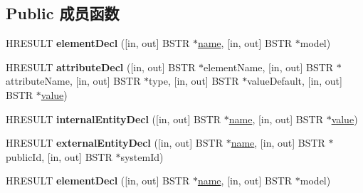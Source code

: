 \subsection*{Public 成员函数}
\begin{DoxyCompactItemize}
\item 
\mbox{\label{interface_m_s_x_m_l2_1_1_i_v_b_s_a_x_decl_handler_a622d111eb247853a526a2771b19ec529}} 
H\+R\+E\+S\+U\+LT {\bfseries element\+Decl} (\mbox{[}in, out\mbox{]} B\+S\+TR $\ast$\hyperlink{structname}{name}, \mbox{[}in, out\mbox{]} B\+S\+TR $\ast$model)
\item 
\mbox{\label{interface_m_s_x_m_l2_1_1_i_v_b_s_a_x_decl_handler_aaa7a2aad3ae3694f9df7ccc2a30b19cd}} 
H\+R\+E\+S\+U\+LT {\bfseries attribute\+Decl} (\mbox{[}in, out\mbox{]} B\+S\+TR $\ast$element\+Name, \mbox{[}in, out\mbox{]} B\+S\+TR $\ast$attribute\+Name, \mbox{[}in, out\mbox{]} B\+S\+TR $\ast$type, \mbox{[}in, out\mbox{]} B\+S\+TR $\ast$value\+Default, \mbox{[}in, out\mbox{]} B\+S\+TR $\ast$\hyperlink{unionvalue}{value})
\item 
\mbox{\label{interface_m_s_x_m_l2_1_1_i_v_b_s_a_x_decl_handler_a0127ed96e123f0bec97b9cd6a73bac31}} 
H\+R\+E\+S\+U\+LT {\bfseries internal\+Entity\+Decl} (\mbox{[}in, out\mbox{]} B\+S\+TR $\ast$\hyperlink{structname}{name}, \mbox{[}in, out\mbox{]} B\+S\+TR $\ast$\hyperlink{unionvalue}{value})
\item 
\mbox{\label{interface_m_s_x_m_l2_1_1_i_v_b_s_a_x_decl_handler_aa042d45b3a26da6c5e85fe91aa8d50b1}} 
H\+R\+E\+S\+U\+LT {\bfseries external\+Entity\+Decl} (\mbox{[}in, out\mbox{]} B\+S\+TR $\ast$\hyperlink{structname}{name}, \mbox{[}in, out\mbox{]} B\+S\+TR $\ast$public\+Id, \mbox{[}in, out\mbox{]} B\+S\+TR $\ast$system\+Id)
\item 
\mbox{\label{interface_m_s_x_m_l2_1_1_i_v_b_s_a_x_decl_handler_a622d111eb247853a526a2771b19ec529}} 
H\+R\+E\+S\+U\+LT {\bfseries element\+Decl} (\mbox{[}in, out\mbox{]} B\+S\+TR $\ast$\hyperlink{structname}{name}, \mbox{[}in, out\mbox{]} B\+S\+TR $\ast$model)
\item 
\mbox{\label{interface_m_s_x_m_l2_1_1_i_v_b_s_a_x_decl_handler_aaa7a2aad3ae3694f9df7ccc2a30b19cd}} 

\end{DoxyCompactItemize}
